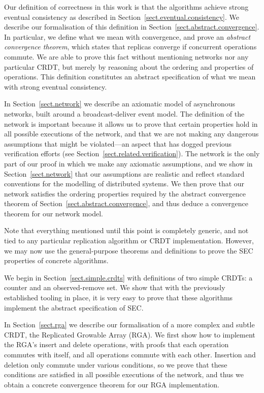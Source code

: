 Our definition of correctness in this work is that the algorithms achieve strong eventual consistency as described in Section~\ref{sect.eventual.consistency}.
We describe our formalisation of this definition in Section~\ref{sect.abstract.convergence}.
In particular, we define what we mean with convergence, and prove an \emph{abstract convergence theorem}, which states that replicas converge if concurrent operations commute.
We are able to prove this fact without mentioning networks nor any particular CRDT, but merely by reasoning about the ordering and properties of operations.
This definition constitutes an abstract specification of what we mean with strong eventual consistency.

In Section~\ref{sect.network} we describe an axiomatic model of asynchronous networks, built around a broadcast-deliver event model.
The definition of the network is important because it allows us to prove that certain properties hold in all possible executions of the network, and that we are not making any dangerous assumptions that might be violated---an aspect that has dogged previous verification efforts (see Section~\ref{sect.related.verification}).
The network is the only part of our proof in which we make any axiomatic assumptions, and we show in Section~\ref{sect.network} that our assumptions are realistic and reflect standard conventions for the modelling of distributed systems.
We then prove that our network satisfies the ordering properties required by the abstract convergence theorem of Section~\ref{sect.abstract.convergence}, and thus deduce a convergence theorem for our network model.

Note that everything mentioned until this point is completely generic, and not tied to any particular replication algorithm or CRDT implementation.
However, we may now use the general-purpose theorems and definitions to prove the SEC properties of concrete algorithms.

We begin in Section~\ref{sect.simple.crdts} with definitions of two simple CRDTs: a counter and an observed-remove set.
We show that with the previously established tooling in place, it is very easy to prove that these algorithms implement the abstract specification of SEC.

In Section~\ref{sect.rga} we describe our formalisation of a more complex and subtle CRDT, the Replicated Growable Array (RGA).
We first show how to implement the RGA's insert and delete operations, with proofs that each operation commutes with itself, and all operations commute with each other.
Insertion and deletion only commute under various conditions, so we prove that these conditions are satisfied in all possible executions of the network, and thus we obtain a concrete convergence theorem for our RGA implementation.

